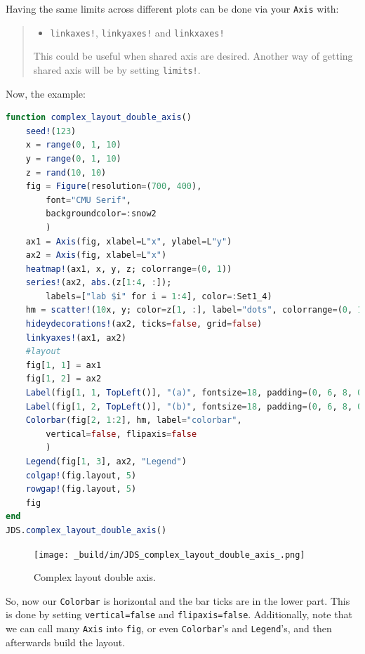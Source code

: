 \documentclass[
  notoc %
]{tufte-book}
\providecommand{\tightlist}{%
  \setlength{\itemsep}{0pt}\setlength{\parskip}{0pt}
}
\newcommand{\passthrough}[1]{#1}
\begin{document}
Having the same limits across different plots can be done via your
\passthrough{\lstinline!Axis!} with:

\begin{quote}
\begin{itemize}
\tightlist
\item
  \passthrough{\lstinline"linkaxes!"},
  \passthrough{\lstinline"linkyaxes!"} and
  \passthrough{\lstinline"linkxaxes!"}
\end{itemize}

This could be useful when shared axis are desired. Another way of
getting shared axis will be by setting
\passthrough{\lstinline"limits!"}.
\end{quote}

Now, the example:

\begin{lstlisting}[language=Julia]
function complex_layout_double_axis()
    seed!(123)
    x = range(0, 1, 10)
    y = range(0, 1, 10)
    z = rand(10, 10)
    fig = Figure(resolution=(700, 400),
        font="CMU Serif",
        backgroundcolor=:snow2
        )
    ax1 = Axis(fig, xlabel=L"x", ylabel=L"y")
    ax2 = Axis(fig, xlabel=L"x")
    heatmap!(ax1, x, y, z; colorrange=(0, 1))
    series!(ax2, abs.(z[1:4, :]);
        labels=["lab $i" for i = 1:4], color=:Set1_4)
    hm = scatter!(10x, y; color=z[1, :], label="dots", colorrange=(0, 1))
    hideydecorations!(ax2, ticks=false, grid=false)
    linkyaxes!(ax1, ax2)
    #layout
    fig[1, 1] = ax1
    fig[1, 2] = ax2
    Label(fig[1, 1, TopLeft()], "(a)", fontsize=18, padding=(0, 6, 8, 0))
    Label(fig[1, 2, TopLeft()], "(b)", fontsize=18, padding=(0, 6, 8, 0))
    Colorbar(fig[2, 1:2], hm, label="colorbar",
        vertical=false, flipaxis=false
        )
    Legend(fig[1, 3], ax2, "Legend")
    colgap!(fig.layout, 5)
    rowgap!(fig.layout, 5)
    fig
end
JDS.complex_layout_double_axis()
\end{lstlisting}

\begin{figure}
\hypertarget{fig:complex_layout_double_axis}{%
\centering
\texttt{[image: \_build/im/JDS\_complex\_layout\_double\_axis\_.png]}
\caption{Complex layout double
axis.}\label{fig:complex_layout_double_axis}
}
\end{figure}

So, now our \passthrough{\lstinline!Colorbar!} is horizontal and the bar
ticks are in the lower part. This is done by setting
\passthrough{\lstinline!vertical=false!} and
\passthrough{\lstinline!flipaxis=false!}. Additionally, note that we can
call many \passthrough{\lstinline!Axis!} into
\passthrough{\lstinline!fig!}, or even
\passthrough{\lstinline!Colorbar!}'s and
\passthrough{\lstinline!Legend!}'s, and then afterwards build the
layout.
\end{document}
